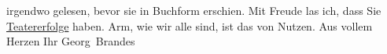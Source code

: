\begin{ledgroupsized}[t]{13cm}
                    irgendwo gelesen, bevor sie in Buchform erschien. Mit Freude las ich, dass Sie
                        \uline{Teatererfolge} haben. Arm, wie wir alle sind,
                    ist das von Nutzen. Aus vollem Herzen\pend
           \pstart Ihr \spacefill\mbox{Georg Brandes}\pend{}          \endnumbering{}\end{ledgroupsized}  \newcommand{\dateiname}{L02462}\newcommand{\titel}{Georg Brandes an Arthur Schnitzler, 30. 12. 1925}\newcommand{\editorInnen}{Martin Anton Müller und Gerd-Hermann Susen}
      